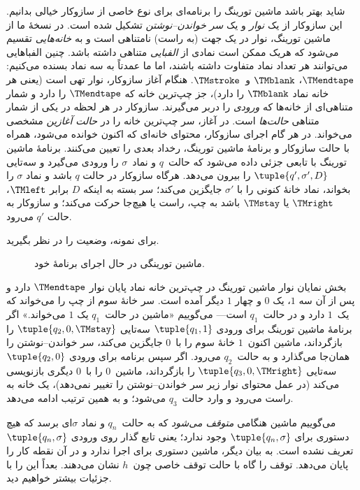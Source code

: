 \documentclass[../../../include/open-logic-section]{subfiles}
\begin{document}
\begin{explain}
شاید بهتر باشد ماشین تورینگ را برنامه‌ای برای نوع خاصی از سازوکار
خیالی بدانیم. این سازوکار از یک \emph{نوار} و یک \emph{سر
خواندن--نوشتن} تشکیل شده است. در نسخهٔ ما از ماشین تورینگ، نوار در
یک جهت (به راست) نامتناهی است و به \emph{خانه‌هایی} تقسیم می‌شود که
هریک ممکن است نمادی از \emph{الفبایی} متناهی داشته باشد. چنین
الفباهایی می‌توانند هر تعداد نماد متفاوت داشته باشند، اما ما عمدتاً
به سه نماد بسنده می‌کنیم: $\TMendtape$، $\TMblank$ و~$\TMstroke$.
هنگام آغاز سازوکار، نوار تهی است (یعنی هر خانه نماد $\TMblank$ را
دارد)، جز چپ‌ترین خانه که $\TMendtape$ را دارد و شمار متناهی‌ای از
خانه‌ها که \emph{ورودی} را دربر می‌گیرند. سازوکار در هر لحظه در یکی
از شمار متناهی \emph{حالت‌ها} است. در آغاز، سر چپ‌ترین خانه را در
\emph{حالت آغازین} مشخصی می‌خواند. در هر گام اجرای سازوکار، محتوای
خانه‌ای که اکنون خوانده می‌شود، همراه با حالت سازوکار و برنامهٔ ماشین
تورینگ، رخداد بعدی را تعیین می‌کنند. برنامهٔ ماشین تورینگ با تابعی
جزئی داده می‌شود که حالت~$q$ و نماد~$\sigma$ را ورودی می‌گیرد و سه‌تایی
$\tuple{q',\sigma',D}$ را بیرون می‌دهد. هرگاه سازوکار در حالت $q$
باشد و نماد $\sigma$ را بخواند، نماد خانهٔ کنونی را با $\sigma'$
جایگزین می‌کند؛ سر بسته به اینکه $D$ برابر $\TMleft$، $\TMright$ یا
$\TMstay$ باشد به چپ، راست یا هیچ‌جا حرکت می‌کند؛ و سازوکار به حالت
$q'$ می‌رود.

برای نمونه، وضعیت  را در نظر بگیرید.
\begin{figure}
  \caption{ماشین تورینگی در حال اجرای برنامهٔ خود.}
\end{figure}
بخش نمایان نوار ماشین تورینگ در چپ‌ترین خانه نماد پایان نوار
$\TMendtape$ دارد و پس از آن سه $1$، یک $0$ و چهار $1$ دیگر آمده است.
سر خانهٔ سوم از چپ را می‌خواند که یک~$1$ دارد و در حالت~$q_1$ است---
می‌گوییم «ماشین در حالت~$q_1$ یک $1$ می‌خواند.» اگر برنامهٔ ماشین
تورینگ برای ورودی $\tuple{q_1,1}$ سه‌تایی
$\tuple{q_2,0,\TMstay}$ را بازگرداند، ماشین اکنون~$1$ خانهٔ سوم را
با~$0$ جایگزین می‌کند، سر خواندن--نوشتن را همان‌جا می‌گذارد و به
حالت~$q_2$ می‌رود. اگر سپس برنامه برای ورودی $\tuple{q_2,0}$ سه‌تایی
$\tuple{q_3,0,\TMright}$ را بازگرداند، ماشین~$0$ را با~$0$ دیگری
بازنویسی می‌کند (در عمل محتوای نوار زیر سر خواندن--نوشتن را تغییر
نمی‌دهد)، یک خانه به راست می‌رود و وارد حالت~$q_3$ می‌شود؛ و به همین
ترتیب ادامه می‌دهد.

می‌گوییم ماشین هنگامی \emph{متوقف می‌شود} که به حالت~$q_n$ و نماد
$\sigma$ای برسد که هیچ دستوری برای $\tuple{q_n,\sigma}$ وجود ندارد؛
یعنی تابع گذار روی ورودی $\tuple{q_n,\sigma}$ تعریف نشده است. به بیان
دیگر، ماشین دستوری برای اجرا ندارد و در آن نقطه کار را پایان می‌دهد.
توقف را گاه با حالت توقف خاصی چون~$h$ نشان می‌دهند. بعداً این را با
جزئیات بیشتر خواهیم دید.
\end{explain}
\end{document}
